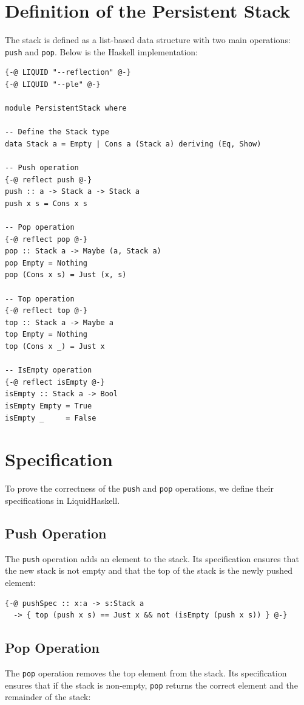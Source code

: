 \documentclass[]{rptuseminar}
\begin{document}
\section{Definition of the Persistent Stack}
The stack is defined as a list-based data structure with two main operations: \texttt{push} and \texttt{pop}. Below is the Haskell implementation:

\begin{lstlisting}[caption=Persistent Stack Implementation]
{-@ LIQUID "--reflection" @-}
{-@ LIQUID "--ple" @-}

module PersistentStack where

-- Define the Stack type
data Stack a = Empty | Cons a (Stack a) deriving (Eq, Show)

-- Push operation
{-@ reflect push @-}
push :: a -> Stack a -> Stack a
push x s = Cons x s

-- Pop operation
{-@ reflect pop @-}
pop :: Stack a -> Maybe (a, Stack a)
pop Empty = Nothing
pop (Cons x s) = Just (x, s)

-- Top operation
{-@ reflect top @-}
top :: Stack a -> Maybe a
top Empty = Nothing
top (Cons x _) = Just x

-- IsEmpty operation
{-@ reflect isEmpty @-}
isEmpty :: Stack a -> Bool
isEmpty Empty = True
isEmpty _     = False
\end{lstlisting}

\section{Specification}
To prove the correctness of the \texttt{push} and \texttt{pop} operations, we define their specifications in LiquidHaskell.

\subsection{Push Operation}
The \texttt{push} operation adds an element to the stack. Its specification ensures that the new stack is not empty and that the top of the stack is the newly pushed element:

\begin{lstlisting}[caption=Push Specification]
{-@ pushSpec :: x:a -> s:Stack a 
  -> { top (push x s) == Just x && not (isEmpty (push x s)) } @-}
\end{lstlisting}

\subsection{Pop Operation}
The \texttt{pop} operation removes the top element from the stack. Its specification ensures that if the stack is non-empty, \texttt{pop} returns the correct element and the remainder of the stack:
\end{document}
